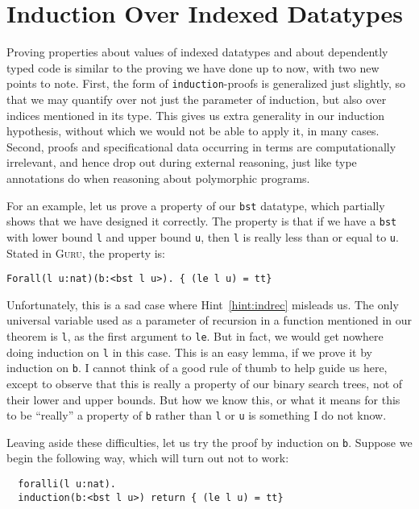 \documentclass{book}[12pt]
\newcommand{\guru}[0]{\textsc{Guru}\xspace}
\begin{document}
\section{Induction Over Indexed Datatypes}
\label{ch8:bst_bounds}

Proving properties about values of indexed datatypes and about
dependently typed code is similar to the proving we have done up to
now, with two new points to note.  First, the form of
\texttt{induction}-proofs is generalized just slightly, so that we may
quantify over not just the parameter of induction, but also over
indices mentioned in its type.  This gives us extra generality in our
induction hypothesis, without which we would not be able to apply it,
in many cases. Second, proofs and specificational data occurring in
terms are computationally irrelevant, and hence drop out during
external reasoning, just like type annotations do when reasoning about
polymorphic programs.

For an example, let us prove a property of our \texttt{bst} datatype,
which partially shows that we have designed it correctly.  The
property is that if we have a \texttt{bst} with lower bound \texttt{l}
and upper bound \texttt{u}, then \texttt{l} is really less than or
equal to \texttt{u}.  Stated in \guru, the property is:

\begin{verbatim}
Forall(l u:nat)(b:<bst l u>). { (le l u) = tt}
\end{verbatim}

\noindent Unfortunately, this is a sad case where
Hint~\ref{hint:indrec} misleads us.  The only universal variable used
as a parameter of recursion in a function mentioned in our theorem is
\texttt{l}, as the first argument to \texttt{le}.  But in fact, we
would get nowhere doing induction on \texttt{l} in this case.  This is
an easy lemma, if we prove it by induction on \texttt{b}.  I cannot
think of a good rule of thumb to help guide us here, except to observe
that this is really a property of our binary search trees, not of
their lower and upper bounds.  But how we know this, or what it means
for this to be ``really'' a property of \texttt{b} rather than
\texttt{l} or \texttt{u} is something I do not know.

Leaving aside these difficulties, let us try the proof by induction on
\texttt{b}.  Suppose we begin the following way, which will turn out
not to work:

\begin{verbatim}
  foralli(l u:nat).
  induction(b:<bst l u>) return { (le l u) = tt}
\end{verbatim}
\end{document}
